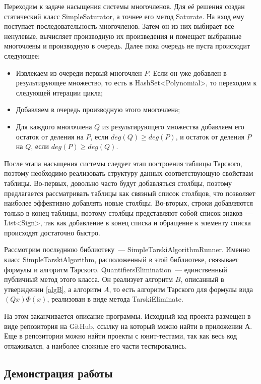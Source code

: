 Переходим к задаче насыщения системы многочленов. Для её решения создан статический класс SimpleSaturator, а точнее его метод Saturate. На вход ему поступает последовательность многочленов. Затем он из них выбирает все ненулевые, вычисляет производную их произведения и помещает выбранные многочлены и производную в очередь. Далее пока очередь не пуста происходит следующее:
\begin{itemize}
    \item Извлекаем из очереди первый многочлен $P$. Если он уже добавлен в результирующее множество, то есть в HashSet<Polynomial>, то переходим к следующей итерации цикла;
    \item Добавляем в очередь производную этого многочлена;
    \item Для каждого многочлена $Q$ из результирующего множества добавляем его остаток от деления на $P$, если $deg(Q) \geq deg(P)$, и остаток от деления $P$ на $Q$, если $deg(P) \geq deg(Q)$.
\end{itemize} 

После этапа насыщения системы следует этап построения таблицы Тарского, поэтому необходимо реализовать структуру данных соответствующую свойствам таблицы. Во-первых, довольно часто будут добавляться столбцы, поэтому предлагается рассматривать таблицы как связный список столбцов, что позволяет наиболее эффективно добавлять новые столбцы. Во-вторых, строки добавляются только в конец таблицы, поэтому столбцы представляют собой список знаков~--- List<Sign>, так как добавление в конец списка и обращение к элементу списка происходят достаточно быстро.

Рассмотрим последнюю библиотеку~--- SimpleTarskiAlgorithmRunner. Именно класс SimpleTarskiAlgorithm, расположенный в этой библиотеке, связывает формулы и алгоритм Тарского. QuantifiersElimination~--- единственный публичный метод этого класса. Он реализует алгоритм $B$, описанный в утверждении \ref{algB}, а алгоритм $A$, то есть алгоритм Тарского для формулы вида $(Qx)\Phi(x)$, реализован в виде метода TarskiEliminate.

На этом заканчивается описание программы. Исходный код проекта размещен в виде репозитория на GitHub, ссылку на который можно найти в приложении А. Еще в репозитории можно найти проекты с юнит-тестами, так как весь код отлаживался, а наиболее сложные его части тестировались.

\subsection{Демонстрация работы}

